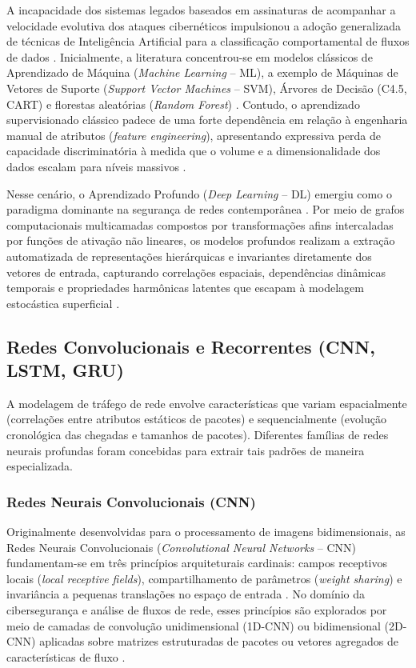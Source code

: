 A incapacidade dos sistemas legados baseados em assinaturas de acompanhar a velocidade evolutiva dos ataques cibernéticos impulsionou a adoção generalizada de técnicas de Inteligência Artificial para a classificação comportamental de fluxos de dados \cite{survey2025dl, neuralcyber2025}. Inicialmente, a literatura concentrou-se em modelos clássicos de Aprendizado de Máquina (\emph{Machine Learning} -- ML), a exemplo de Máquinas de Vetores de Suporte (\emph{Support Vector Machines} -- SVM), Árvores de Decisão (C4.5, CART) e florestas aleatórias (\emph{Random Forest}) \cite{feature2018}. Contudo, o aprendizado supervisionado clássico padece de uma forte dependência em relação à engenharia manual de atributos (\emph{feature engineering}), apresentando expressiva perda de capacidade discriminatória à medida que o volume e a dimensionalidade dos dados escalam para níveis massivos \cite{advancedids2024}.

Nesse cenário, o Aprendizado Profundo (\emph{Deep Learning} -- DL) emergiu como o paradigma dominante na segurança de redes contemporânea \cite{survey2025dl}. Por meio de grafos computacionais multicamadas compostos por transformações afins intercaladas por funções de ativação não lineares, os modelos profundos realizam a extração automatizada de representações hierárquicas e invariantes diretamente dos vetores de entrada, capturando correlações espaciais, dependências dinâmicas temporais e propriedades harmônicas latentes que escapam à modelagem estocástica superficial \cite{temporal2025, timematters2025}.

\subsection{Redes Convolucionais e Recorrentes (CNN, LSTM, GRU)}
\label{subsec:cnn_lstm_gru}

A modelagem de tráfego de rede envolve características que variam espacialmente (correlações entre atributos estáticos de pacotes) e sequencialmente (evolução cronológica das chegadas e tamanhos de pacotes). Diferentes famílias de redes neurais profundas foram concebidas para extrair tais padrões de maneira especializada.

\subsubsection{Redes Neurais Convolucionais (CNN)}

Originalmente desenvolvidas para o processamento de imagens bidimensionais, as Redes Neurais Convolucionais (\emph{Convolutional Neural Networks} -- CNN) fundamentam-se em três princípios arquiteturais cardinais: campos receptivos locais (\emph{local receptive fields}), compartilhamento de parâmetros (\emph{weight sharing}) e invariância a pequenas translações no espaço de entrada \cite{survey2025dl}. No domínio da cibersegurança e análise de fluxos de rede, esses princípios são explorados por meio de camadas de convolução unidimensional (1D-CNN) ou bidimensional (2D-CNN) aplicadas sobre matrizes estruturadas de pacotes ou vetores agregados de características de fluxo \cite{netflow2020}.

